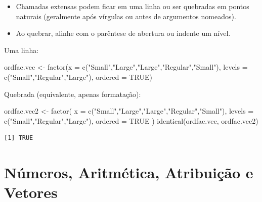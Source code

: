 \documentclass[
  letterpaper,
  DIV=11,
  numbers=noendperiod]{scrreprt}
\newenvironment{Shaded}{\begin{snugshade}}{\end{snugshade}}
\newcommand{\AttributeTok}[1]{\textcolor[rgb]{0.40,0.45,0.13}{#1}}
\newcommand{\ConstantTok}[1]{\textcolor[rgb]{0.56,0.35,0.01}{#1}}
\newcommand{\FunctionTok}[1]{\textcolor[rgb]{0.28,0.35,0.67}{#1}}
\newcommand{\NormalTok}[1]{\textcolor[rgb]{0.00,0.23,0.31}{#1}}
\newcommand{\OtherTok}[1]{\textcolor[rgb]{0.00,0.23,0.31}{#1}}
\newcommand{\StringTok}[1]{\textcolor[rgb]{0.13,0.47,0.30}{#1}}
\begin{document}
\begin{itemize}
\item
  Chamadas extensas podem ficar em uma linha ou ser quebradas em pontos
  naturais (geralmente após vírgulas ou antes de argumentos nomeados).
\item
  Ao quebrar, alinhe com o parêntese de abertura ou indente um nível.
\end{itemize}

Uma linha:

\begin{Shaded}
\begin{Highlighting}[]
\NormalTok{ordfac.vec }\OtherTok{\textless{}{-}} \FunctionTok{factor}\NormalTok{(}\AttributeTok{x =} \FunctionTok{c}\NormalTok{(}\StringTok{"Small"}\NormalTok{,}\StringTok{"Large"}\NormalTok{,}\StringTok{"Large"}\NormalTok{,}\StringTok{"Regular"}\NormalTok{,}\StringTok{"Small"}\NormalTok{),}
                     \AttributeTok{levels =} \FunctionTok{c}\NormalTok{(}\StringTok{"Small"}\NormalTok{,}\StringTok{"Regular"}\NormalTok{,}\StringTok{"Large"}\NormalTok{),}
                     \AttributeTok{ordered =} \ConstantTok{TRUE}\NormalTok{)}
\end{Highlighting}
\end{Shaded}

Quebrada (equivalente, apenas formatação):

\begin{Shaded}
\begin{Highlighting}[]
\NormalTok{ordfac.vec2 }\OtherTok{\textless{}{-}}
  \FunctionTok{factor}\NormalTok{(}
    \AttributeTok{x       =} \FunctionTok{c}\NormalTok{(}\StringTok{"Small"}\NormalTok{,}\StringTok{"Large"}\NormalTok{,}\StringTok{"Large"}\NormalTok{,}\StringTok{"Regular"}\NormalTok{,}\StringTok{"Small"}\NormalTok{),}
    \AttributeTok{levels  =} \FunctionTok{c}\NormalTok{(}\StringTok{"Small"}\NormalTok{,}\StringTok{"Regular"}\NormalTok{,}\StringTok{"Large"}\NormalTok{),}
    \AttributeTok{ordered =} \ConstantTok{TRUE}
\NormalTok{  )}
\FunctionTok{identical}\NormalTok{(ordfac.vec, ordfac.vec2)}
\end{Highlighting}
\end{Shaded}

\begin{verbatim}
[1] TRUE
\end{verbatim}

\section{Números, Aritmética, Atribuição e
Vetores}\label{nuxfameros-aritmuxe9tica-atribuiuxe7uxe3o-e-vetores}
\end{document}
